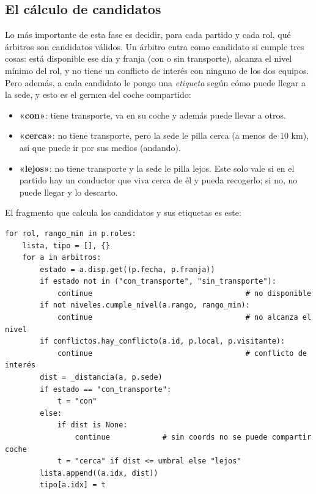 \documentclass[11pt,a4paper,spanish]{book}
\numberwithin{equation}{chapter}
\numberwithin{figure}{chapter}
\numberwithin{table}{chapter}
\begin{document}
\subsection{El cálculo de candidatos}

Lo más importante de esta fase es decidir, para cada partido y cada rol, qué árbitros son candidatos válidos. Un árbitro entra como candidato si cumple tres cosas: está disponible ese día y franja (con o sin transporte), alcanza el nivel mínimo del rol, y no tiene un conflicto de interés con ninguno de los dos equipos. Pero además, a cada candidato le pongo una \emph{etiqueta} según cómo puede llegar a la sede, y esto es el germen del coche compartido:

\begin{itemize}
\item {\bf «con»}: tiene transporte, va en su coche y además puede llevar a otros.
\item {\bf «cerca»}: no tiene transporte, pero la sede le pilla cerca (a menos de 10 km), así que puede ir por sus medios (andando).
\item {\bf «lejos»}: no tiene transporte y la sede le pilla lejos. Este solo vale si en el partido hay un conductor que viva cerca de él y pueda recogerlo; si no, no puede llegar y lo descarto.
\end{itemize}

El fragmento que calcula los candidatos y sus etiquetas es este:

\begin{lstlisting}[caption={Cálculo de candidatos por (partido, rol) y su etiqueta de transporte (\texttt{datos.py}).},label={lst:candidatos}]
for rol, rango_min in p.roles:
    lista, tipo = [], {}
    for a in arbitros:
        estado = a.disp.get((p.fecha, p.franja))
        if estado not in ("con_transporte", "sin_transporte"):
            continue                                   # no disponible
        if not niveles.cumple_nivel(a.rango, rango_min):
            continue                                   # no alcanza el nivel
        if conflictos.hay_conflicto(a.id, p.local, p.visitante):
            continue                                   # conflicto de interés
        dist = _distancia(a, p.sede)
        if estado == "con_transporte":
            t = "con"
        else:
            if dist is None:
                continue            # sin coords no se puede compartir coche
            t = "cerca" if dist <= umbral else "lejos"
        lista.append((a.idx, dist))
        tipo[a.idx] = t
\end{lstlisting}
\end{document}
